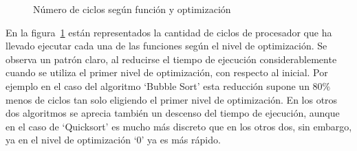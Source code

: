 \begin{figure}[htbp]
\begin{center}
\end{center}
\caption{Número de ciclos según función y optimización}
\label{graph:ciclos}
\end{figure}

En la figura~\ref{graph:ciclos} están representados la cantidad de ciclos de procesador que ha llevado ejecutar cada una de las funciones según el nivel de optimización. Se observa un patrón claro, al reducirse el tiempo de ejecución considerablemente cuando se utiliza el primer nivel de optimización, con respecto al inicial. Por ejemplo en el caso del algoritmo `Bubble Sort' esta reducción supone un 80\% menos de ciclos tan solo eligiendo el primer nivel de optimización. En los otros dos algoritmos se aprecia también un descenso del tiempo de ejecución, aunque en el caso de `Quicksort' es mucho más discreto que en los otros dos, sin embargo, ya en el nivel de optimización `0' ya es más rápido.

